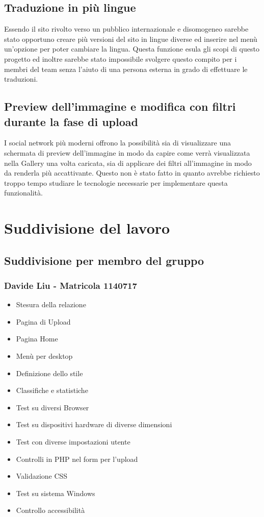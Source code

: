 \documentclass[openany, a4paper, 12pt]{report}
\begin{document}
		\section{Traduzione in più lingue}
		Essendo il sito rivolto verso un pubblico internazionale e disomogeneo sarebbe stato opportuno creare più versioni del sito in lingue diverse ed inserire nel menù un'opzione per poter cambiare la lingua. Questa funzione esula gli scopi di questo progetto ed inoltre sarebbe stato impossibile svolgere questo compito per i membri del team senza l'aiuto di una persona esterna in grado di effettuare le traduzioni.
		
		\section{Preview dell'immagine e modifica con filtri durante la fase di upload}
		I social network più moderni offrono la possibilità sia di visualizzare una schermata di preview dell'immagine in modo da capire come verrà visualizzata nella Gallery una volta caricata, sia di applicare dei filtri all'immagine in modo da renderla più accattivante. Questo non è stato fatto in quanto avrebbe richiesto troppo tempo studiare le tecnologie necessarie per implementare questa funzionalità.


	\chapter{Suddivisione del lavoro}
	\section{Suddivisione per membro del gruppo}
	\subsection{Davide Liu - Matricola 1140717}
	\begin{itemize}
		\item Stesura della relazione
		\item Pagina di Upload
		\item Pagina Home
		\item Menù per desktop
		\item Definizione dello stile
		\item Classifiche e statistiche
		\item Test su diversi Browser
		\item Test su dispositivi hardware di diverse
		 dimensioni
		\item Test con diverse impostazioni utente
		\item Controlli in PHP nel form per l'upload
		\item Validazione CSS
		\item Test su sistema Windows
		\item Controllo accessibilità
	\end{itemize}
\end{document}
